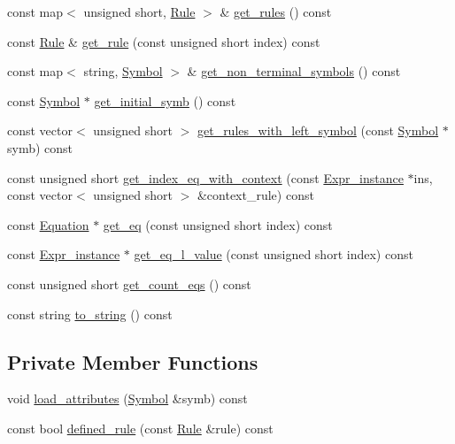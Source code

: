 \begin{DoxyCompactItemize}
\item 
const map$<$ unsigned short, \hyperlink{classgenevalmag_1_1Rule}{Rule} $>$ \& \hyperlink{classgenevalmag_1_1Attr__grammar_a41be9d108df7f8159bd989a5c174be87}{get\_\-rules} () const 
\item 
const \hyperlink{classgenevalmag_1_1Rule}{Rule} \& \hyperlink{classgenevalmag_1_1Attr__grammar_a3452d5ee579a9985a52edcf6a97678d5}{get\_\-rule} (const unsigned short index) const 
\item 
const map$<$ string, \hyperlink{classgenevalmag_1_1Symbol}{Symbol} $>$ \& \hyperlink{classgenevalmag_1_1Attr__grammar_a50a326649bbf48d2d715144cef59a75e}{get\_\-non\_\-terminal\_\-symbols} () const 
\item 
const \hyperlink{classgenevalmag_1_1Symbol}{Symbol} $\ast$ \hyperlink{classgenevalmag_1_1Attr__grammar_a5a476aa583e3f9e1bbfe182b5ee2f759}{get\_\-initial\_\-symb} () const 
\item 
const vector$<$ unsigned short $>$ \hyperlink{classgenevalmag_1_1Attr__grammar_a0f88798aa739681bf39c2620b1f39069}{get\_\-rules\_\-with\_\-left\_\-symbol} (const \hyperlink{classgenevalmag_1_1Symbol}{Symbol} $\ast$symb) const 
\item 
const unsigned short \hyperlink{classgenevalmag_1_1Attr__grammar_a47242caf1e804a8fc50e0ab75ea39570}{get\_\-index\_\-eq\_\-with\_\-context} (const \hyperlink{classgenevalmag_1_1Expr__instance}{Expr\_\-instance} $\ast$ins, const vector$<$ unsigned short $>$ \&context\_\-rule) const 
\item 
const \hyperlink{classgenevalmag_1_1Equation}{Equation} $\ast$ \hyperlink{classgenevalmag_1_1Attr__grammar_a8a1e41dee53587c04675a3a46df941af}{get\_\-eq} (const unsigned short index) const 
\item 
const \hyperlink{classgenevalmag_1_1Expr__instance}{Expr\_\-instance} $\ast$ \hyperlink{classgenevalmag_1_1Attr__grammar_a9d743d32f7ecb1f31284d04db9e3051e}{get\_\-eq\_\-l\_\-value} (const unsigned short index) const 
\item 
const unsigned short \hyperlink{classgenevalmag_1_1Attr__grammar_ad94a52850c818a1f74fc81af99b0d52d}{get\_\-count\_\-eqs} () const 
\item 
const string \hyperlink{classgenevalmag_1_1Attr__grammar_ad2f2da693afe958a6dc84078c391100e}{to\_\-string} () const 
\end{DoxyCompactItemize}
\subsection*{Private Member Functions}
\begin{DoxyCompactItemize}
\item 
void \hyperlink{classgenevalmag_1_1Attr__grammar_afaa4c9d59c02bb170691cad72bf97c68}{load\_\-attributes} (\hyperlink{classgenevalmag_1_1Symbol}{Symbol} \&symb) const 
\item 
const bool \hyperlink{classgenevalmag_1_1Attr__grammar_a3d7a28dbbd12cbfc7a0bb41a7f8b8ab7}{defined\_\-rule} (const \hyperlink{classgenevalmag_1_1Rule}{Rule} \&rule) const 
\end{DoxyCompactItemize}
